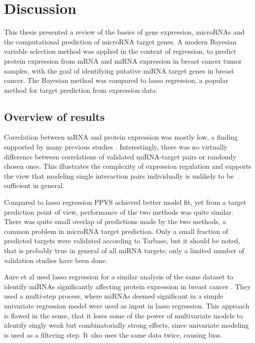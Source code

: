 
\section{Discussion}

This thesis presented a review of the basics of gene expression, microRNAs and
the computational prediction of microRNA target genes. A modern Bayesian
variable selection method was applied in the context of regression, to predict
protein expression from mRNA and miRNA expression in breast cancer tumor
samples, with the goal of identifying putative miRNA target genes in breast
cancer. The Bayesian method was compared to lasso regression, a popular method
for target prediction from expression data.

\subsection*{Overview of results}

Correlation between mRNA and protein expression was mostly low, a finding
supported by many previous studies \citep{Payne2015}. Interestingly, there was
no virtually difference between correlations of validated miRNA-target pairs
or randomly chosen ones. This illustrates the complexity of expression
regulation and supports the view that modeling single interaction pairs
individually is unlikely to be sufficient in general.

Compared to lasso regression PPVS achieved better model fit, yet from a target
prediction point of view, performance of the two methods was quite similar.
There was quite small overlap of predictions made by the two methods, a common
problem in microRNA target prediction. Only a small fraction of predicted
targets were validated according to Tarbase, but it should be noted, that is
probably true in general of all miRNA targets; only a limited number of
validation studies have been done.

Aure et al used lasso regression for a similar analysis of the same dataset
to identify miRNAs significantly affecting protein expression in breast
cancer \citep{Aure2015}. They used a multi-step process, where miRNAs deemed significant in a
simple univariate regression model were used as input in lasso regression.
This approach is flawed in the sense, that it loses some of the power of
multivariate models to identify singly weak but combinatorially strong
effects, since univariate modeling is used as a filtering step. It also uses
the same data twice, causing bias.

